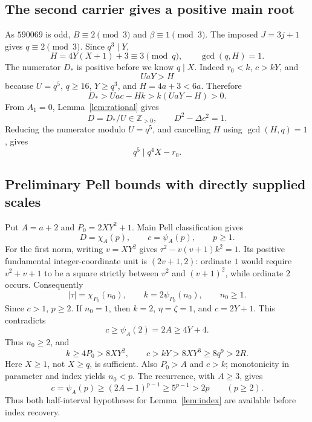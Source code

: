 \documentclass[11pt,a4paper]{article}
\theoremstyle{definition}
\theoremstyle{remark}
\newcommand{\Zpos}{\mathbb Z_{>0}}
\begin{document}
\subsection{The second carrier gives a positive main root}

As \(590069\) is odd, \(B\equiv2\pmod3\) and \(\beta\equiv1\pmod3\).
The imposed \(J=3j+1\) gives \(q\equiv2\pmod3\).
Since \(q^3\mid Y\),
\[
 H=4Y(X+1)+3\equiv3\pmod q,\qquad \gcd(q,H)=1.
\]
The numerator \(D_*\) is positive before we know \(q\mid X\).
Indeed \(r_0<k\), \(c>kY\), and
\[
 UaY>H
\]
because \(U=q^5\), \(q\ge16\), \(Y\ge q^3\), and \(H=4a+3<6a\).
Therefore
\begin{equation}
 D_*>Uac-Hk>k(UaY-H)>0.                     \label{eq:Dpositive}
\end{equation}
From \(A_1=0\), Lemma~\ref{lem:rational} gives
\begin{equation}
 D=D_*/U\in\Zpos,\qquad D^2-\Delta c^2=1.
                                                        \label{eq:Drecover}
\end{equation}
Reducing the numerator modulo \(U=q^5\), and cancelling \(H\) using
\(\gcd(H,q)=1\), gives
\begin{equation}
 q^5\mid q^4X-r_0.                          \label{eq:q5carrier}
\end{equation}

\subsection{Preliminary Pell bounds with directly supplied scales}

Put \(A=a+2\) and \(P_0=2XY^2+1\). Main Pell classification gives
\[
 D=\chi_A(p),\qquad c=\psi_A(p),\qquad p\ge1.
\]
For the first norm, writing \(v=XY^2\) gives
\(\tau^2-v(v+1)k^2=1\).
Its positive fundamental integer-coordinate unit is \((2v+1,2)\):
ordinate \(1\) would require \(v^2+v+1\) to be a square strictly between
\(v^2\) and \((v+1)^2\), while ordinate \(2\) occurs.
Consequently
\[
 |\tau|=\chi_{P_0}(n_0),\qquad
 k=2\psi_{P_0}(n_0),\qquad n_0\ge1.
\]
Since \(c>1\), \(p\ge2\). If \(n_0=1\), then \(k=2\),
\(\eta=\zeta=1\), and \(c=2Y+1\). This contradicts
\[
 c\ge\psi_A(2)=2A\ge4Y+4.
\]
Thus \(n_0\ge2\), and
\begin{equation}
 k\ge4P_0>8XY^2,\qquad
 c>kY>8XY^3\ge8q^9>2R.                     \label{eq:cR}
\end{equation}
Here \(X\ge1\), not \(X\ge q\), is sufficient.
Also \(P_0>A\) and \(c>k\); monotonicity in parameter and index yields
\(n_0<p\). The recurrence, with \(A\ge3\), gives
\begin{equation}
 c=\psi_A(p)\ge(2A-1)^{p-1}\ge5^{p-1}>2p
 \qquad(p\ge2).
                                                        \label{eq:cp}
\end{equation}
Thus both half-interval hypotheses for Lemma~\ref{lem:index} are
available before index recovery.
\end{document}
